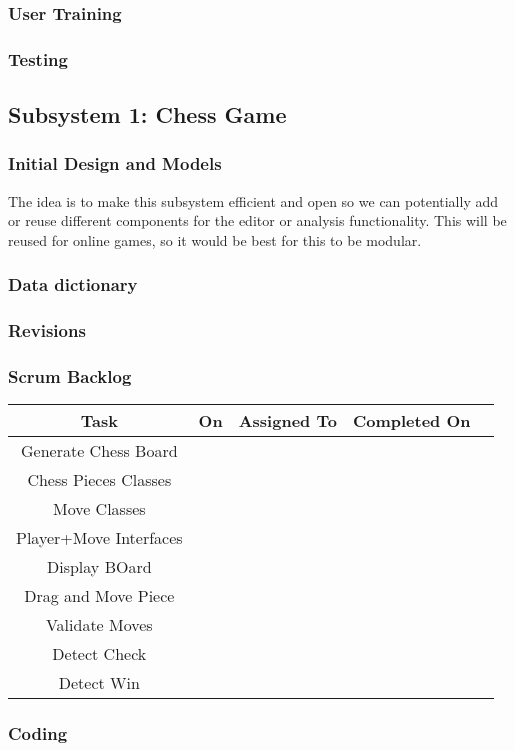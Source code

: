 \documentclass{article}
\begin{document}
\subsubsection{User Training}
\subsubsection{Testing}
\newpage
\subsection{Subsystem 1: Chess Game}
\subsubsection{Initial Design and Models}
The idea is to make this subsystem efficient and open so we can potentially add or reuse different components for the editor or analysis functionality. This will be reused for online games, so it would be best for this to be modular.
\subsubsection{Data dictionary}
\subsubsection{Revisions}
\subsubsection{Scrum Backlog}
\begin{tabular}{|c|c|c|c|c|}
  Task & On & Assigned To & Completed On\\\hline
  Generate Chess Board &  & \\\hline
  Chess Pieces Classes & & \\\hline
  Move Classes & & \\\hline
  Player+Move Interfaces & & \\\hline
  Display BOard & & \\\hline
  Drag and Move Piece & & \\\hline
  Validate Moves & & \\\hline
  Detect Check & & \\\hline
  Detect Win &  & \\\hline
\end{tabular}
\subsubsection{Coding}
\end{document}
